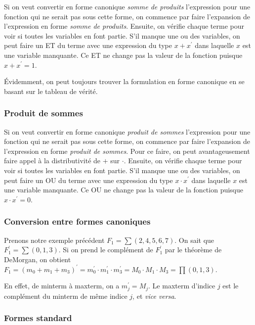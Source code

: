 \documentclass[11pt]{article}
\begin{document}
Si on veut convertir en forme canonique \emph{somme de produits} l'expression
pour une fonction qui ne serait pas sous cette forme, on commence par
faire l'expansion de l'expression en forme \emph{somme de produits}. Ensuite,
on vérifie chaque terme pour voir si toutes les variables en font
partie. S'il manque une ou des variables, on peut faire un ET du
terme avec une expression du type \(x + x^\prime\) dans laquelle \(x\)
est une variable manquante. Ce ET ne change pas la valeur de la
fonction puisque \(x + x^\prime = 1\).

Évidemment, on peut toujours trouver la formulation en forme canonique
en se basant sur le tableau de vérité.

\subsubsection{Produit de sommes}
\label{sec:org1f6eb03}

Si on veut convertir en forme canonique \emph{produit de sommes}
l'expression pour une fonction qui ne serait pas sous cette forme, on
commence par faire l'expansion de l'expression en forme \emph{produit de
sommes}. Pour ce faire, on peut avantageusement faire appel à la
distributivité de \(+\) sur \(\cdot\). Ensuite, on vérifie chaque
terme pour voir si toutes les variables en font partie. S'il manque
une ou des variables, on peut faire un OU du terme avec une expression
du type \(x \cdot x^\prime\) dans laquelle \(x\) est une variable
manquante. Ce OU ne change pas la valeur de la fonction puisque \(x
\cdot x^\prime = 0\).

\subsubsection{Conversion entre formes canoniques}
\label{sec:org782a9ee}

Prenons notre exemple précédent \(F_1 = \sum (2, 4, 5, 6, 7)\). On
sait que \(F_1^\prime = \sum (0,1,3)\). Si on prend le complément de
\(F_1^\prime\) par le théorème de DeMorgan, on obtient \(F_1 = (m_0 +
m_1 + m_3)^\prime = m_0^\prime \cdot m_1^\prime \cdot m_3^\prime = M_0
\cdot M_1 \cdot M_3 = \prod (0,1,3)\).

En effet, de minterm à maxterm, on a \(m_j^\prime = M_j\). Le maxterm
d'indice \(j\) est le complément du minterm de même indice \(j\), et
\emph{vice versa}.

\subsubsection{Formes standard}
\label{sec:org74d3ef8}
\end{document}
